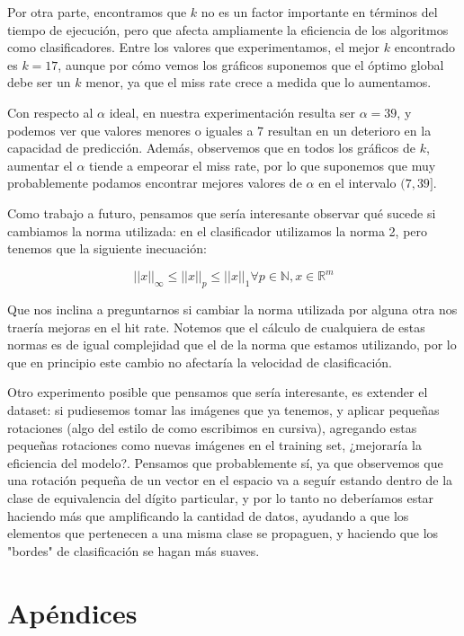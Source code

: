 \documentclass{article}
\begin{document}
Por otra parte, encontramos que $k$ no es un factor importante en términos del tiempo de ejecución, pero que afecta ampliamente la eficiencia de los algoritmos como clasificadores. Entre los valores que experimentamos, el mejor $k$ encontrado es $k = 17$, aunque por cómo vemos los gráficos suponemos que el óptimo global debe ser un $k$ menor, ya que el miss rate crece a medida que lo aumentamos.

Con respecto al $\alpha$ ideal, en nuestra experimentación resulta ser $\alpha = 39$, y podemos ver que valores menores o iguales a 7 resultan en un deterioro en la capacidad de predicción. Además, observemos que en todos los gráficos de $k$, aumentar el $\alpha$ tiende a empeorar el miss rate, por lo que suponemos que muy probablemente podamos encontrar mejores valores de $\alpha$ en el intervalo $(7, 39]$.

Como trabajo a futuro, pensamos que sería interesante observar qué sucede si cambiamos la norma utilizada: en el clasificador utilizamos la norma 2, pero tenemos que la siguiente inecuación:

$$||x||_\infty \leq ||x||_p \leq ||x||_1 \forall p \in \mathbb{N}, x \in \mathbb{R}^m$$

Que nos inclina a preguntarnos si cambiar la norma utilizada por alguna otra nos traería mejoras en el hit rate. Notemos que el cálculo de cualquiera de estas normas es de igual complejidad que el de la norma que estamos utilizando, por lo que en principio este cambio no afectaría la velocidad de clasificación.

Otro experimento posible que pensamos que sería interesante, es extender el dataset: si pudiesemos tomar las imágenes que ya tenemos, y aplicar pequeñas rotaciones (algo del estilo de como escribimos en cursiva), agregando estas pequeñas rotaciones como nuevas imágenes en el training set, ¿mejoraría la eficiencia del modelo?. Pensamos que probablemente sí, ya que observemos que una rotación pequeña de un vector en el espacio va a seguír estando dentro de la clase de equivalencia del dígito particular, y por lo tanto no deberíamos estar haciendo más que amplificando la cantidad de datos, ayudando a que los elementos que pertenecen a una misma clase se propaguen, y haciendo que los "bordes" de clasificación se hagan más suaves.

\section{Apéndices}
\end{document}
